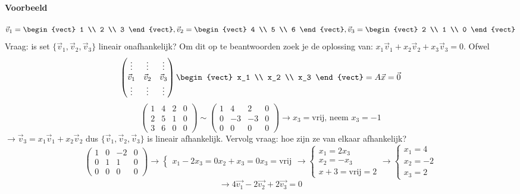 \paragraph{Voorbeeld}
\[ \vec{v}_1 = \begin{vect} 1 \\ 2 \\ 3 \end{vect}, \vec{v}_2 = \begin{vect} 4 \\ 5 \\ 6 \end{vect}, \vec{v}_3 = \begin{vect} 2 \\ 1 \\ 0 \end{vect} \]
Vraag: is set $\{\vec{v}_1, \vec{v}_2, \vec{v}_3 \}$ lineair onafhankelijk? Om dit op te beantwoorden zoek je de oplossing van: $x_1\vec{v}_1 + x_2 \vec{v}_2 + x_3 \vec{v}_3 = 0$. Ofwel
\[ \begin{pmatrix}
	\vdots & \vdots & \vdots \\
	\vec{v}_1 & \vec{v}_2 & \vec{v}_3 \\
	\vdots & \vdots & \vdots
\end{pmatrix} \begin{vect} x_1 \\ x_2 \\ x_3 \end{vect} = A \vec{x} = \vec{0} \]
\[ \left(\!\begin{array}{rrr|r}
	1 & 4 & 2 & 0 \\
	2 & 5 & 1 & 0 \\
	3 & 6 & 0 & 0
\end{array} \!\right) \sim \left(\!\begin{array}{rrr|r}
	1 & 4 & 2 & 0 \\
	0 & -3 & -3 & 0 \\
	0 & 0 & 0 & 0
\end{array}\!\right) \to x_3 = \mbox{vrij, neem } x_3 = -1 \]
$\to \vec{v}_3 = x_1 \vec{v}_1 + x_2 \vec{v}_2$ dus $\{\vec{v}_1, \vec{v}_2, \vec{v}_3 \}$ is lineair afhankelijk. Vervolg vraag: hoe zijn ze van elkaar afhankelijk?
\[ \left(\!\begin{array}{rrr|r}
	1 & 0 & -2 & 0 \\
	0 & 1 & 1 & 0 \\
	0 & 0 & 0 & 0
\end{array}\!\right) \to \left\{\!\begin{array}{l}
	x_1 - 2x_3 = 0
	x_2 + x_3 = 0
	x_3 = \mbox{vrij}
\end{array} \right. \to \left\{\!\begin{array}{l}
	x_1 = 2x_3 \\
	x_2 = -x_3 \\
	x+3 = \mbox{vrij} = 2
\end{array} \right. \to \left\{\!\begin{array}{l}
	x_1 = 4 \\
	x_2 = -2 \\
	x_3 = 2
\end{array} \right. \]
\[ \to 4 \vec{v_1} - 2 \vec{v_2} + 2 \vec{v_3} = 0 \]

